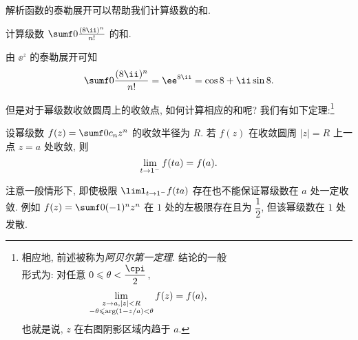 解析函数的泰勒展开可以帮助我们计算级数的和.

\begin{example}
  计算级数 $\sumf0 \frac{(8\ii)^n}{n!}$ 的和.
\end{example}

\begin{solution}
  由 $\ee^z$ 的泰勒展开可知
  \[
     \sumf0 \frac{(8\ii)^n}{n!}
    =\ee^{8\ii}
    =\cos 8+\ii \sin 8.
  \]
\end{solution}

但是对于幂级数收敛圆周上的收敛点, 如何计算相应的和呢?
我们有如下定理:\footnote{%
  相应地, 前述\thmAF 被称为\emph{阿贝尔第一定理}. \thmAS 结论的一般\\
  形式为: 对任意 $0\le \theta<\dfrac\cpi2$,
  \begin{align*}
    \lim_{\substack{z\rightarrow a,|z|<R\\-\theta\leqslant\arg (1-z/a)<\theta}}f(z)=f(a),\qquad\qquad\qquad&&&
  \end{align*}
  也就是说, $z$ 在右图阴影区域内趋于 $a$.
}

\begin{theorem}[阿贝尔第二定理]
  \label{thm:abel-second}
  设幂级数 $f(z)=\sumf0 c_nz^n$ 的收敛半径为 $R$.
  若 $f(z)$ 在收敛圆周 $|z|=R$ 上一点 $z=a$ 处收敛, 则
  \[
    \lim_{t\rightarrow 1^-}f(ta)=f(a).
  \]
\end{theorem}

注意一般情形下, 即使极限 $\liml_{t\ra 1^-}f(ta)$ 存在也不能保证幂级数在 $a$ 处一定收敛.
例如 $f(z)=\sumf0 (-1)^nz^n$ 在 $1$ 处的左极限存在且为 $\dfrac12$, 但该幂级数在 $1$ 处发散.

